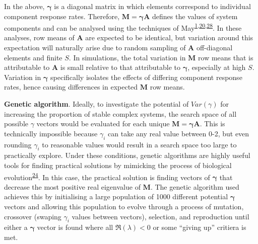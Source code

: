 \documentclass[]{article}
\begin{document}
In the above, \(\mathbf{\gamma}\) is a diagonal matrix in which elements
correspond to individual component response rates. Therefore,
\(\mathbf{M} = \mathbf{\gamma} \mathbf{A}\) defines the values of system
components and can be analysed using the techniques of
May\textsuperscript{\protect\hyperlink{ref-May1972}{1},\protect\hyperlink{ref-Ahmadian2015}{20},\protect\hyperlink{ref-May1973}{28}}.
In these analyses, row means of \(\mathbf{A}\) are expected to be
identical, but variation around this expectation will naturally arise
due to random sampling of \(\mathbf{A}\) off-diagonal elements and
finite \(S\). In simulations, the total variation in \(\mathbf{M}\) row
means that is attributable to \(\mathbf{A}\) is small relative to that
attributable to \(\mathbf{\gamma}\), especially at high \(S\). Variation
in \(\mathbf{\gamma}\) specifically isolates the effects of differing
component response rates, hence causing differences in expected
\(\mathbf{M}\) row means.

\textbf{Genetic algorithm}. Ideally, to investigate the potential of
\(Var(\gamma)\) for increasing the proportion of stable complex systems,
the search space of all possible \(\gamma\) vectors would be evaluated
for each unique \(\mathbf{M = \gamma A}\). This is technically
impossible because \(\gamma_{i}\) can take any real value between 0-2,
but even rounding \(\gamma_{i}\) to reasonable values would result in a
search space too large to practically explore. Under these conditions,
genetic algorithms are highly useful tools for finding practical
solutions by mimicking the process of biological
evolution\textsuperscript{\protect\hyperlink{ref-Hamblin2013}{24}}. In
this case, the practical solution is finding vectors of
\(\mathbf{\gamma}\) that decrease the most positive real eigenvalue of
\(\mathbf{M}\). The genetic algorithm used achieves this by initialising
a large population of 1000 different potential \(\mathbf{\gamma}\)
vectors and allowing this population to evolve through a process of
mutation, crossover (swaping \(\gamma_{i}\) values between vectors),
selection, and reproduction until either a \(\mathbf{\gamma}\) vector is
found where all \(\Re(\lambda) < 0\) or some ``giving up'' critiera is
met.
\end{document}
